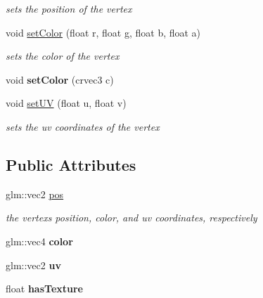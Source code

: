 \begin{DoxyCompactItemize}
\begin{DoxyCompactList}\small\item\em sets the position of the vertex \end{DoxyCompactList}\item 
\mbox{\label{structnta_1_1Vertex2D_a12483720589a9836dd4628b2c2bc480c}} 
void \hyperlink{structnta_1_1Vertex2D_a12483720589a9836dd4628b2c2bc480c}{set\+Color} (float r, float g, float b, float a)
\begin{DoxyCompactList}\small\item\em sets the color of the vertex \end{DoxyCompactList}\item 
\mbox{\label{structnta_1_1Vertex2D_a353285f6dc33e239b6c1290f50db1a3a}} 
void {\bfseries set\+Color} (crvec3 c)
\item 
\mbox{\label{structnta_1_1Vertex2D_adb7b7e6498200e6f11965b0ecadeaa97}} 
void \hyperlink{structnta_1_1Vertex2D_adb7b7e6498200e6f11965b0ecadeaa97}{set\+UV} (float u, float v)
\begin{DoxyCompactList}\small\item\em sets the uv coordinates of the vertex \end{DoxyCompactList}\end{DoxyCompactItemize}
\subsection*{Public Attributes}
\begin{DoxyCompactItemize}
\item 
\mbox{\label{structnta_1_1Vertex2D_a27a44e1ca52b5a5a13d37495e9376636}} 
glm\+::vec2 \hyperlink{structnta_1_1Vertex2D_a27a44e1ca52b5a5a13d37495e9376636}{pos}
\begin{DoxyCompactList}\small\item\em the vertex\textquotesingle{}s position, color, and uv coordinates, respectively \end{DoxyCompactList}\item 
\mbox{\label{structnta_1_1Vertex2D_a05016aff7572c60a2cb688e67b2a4a31}} 
glm\+::vec4 {\bfseries color}
\item 
\mbox{\label{structnta_1_1Vertex2D_a71707b6c29cae0e883e76042e27e84d5}} 
glm\+::vec2 {\bfseries uv}
\item 
\mbox{\label{structnta_1_1Vertex2D_ac1b1fb722a89abaee9cddfb59543af85}} 
float {\bfseries has\+Texture}
\end{DoxyCompactItemize}
